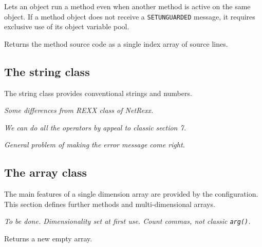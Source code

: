 

Lets an object run a method even when another method is active on the
same object. If a method object does not receive a \texttt{SETUNGUARDED}
message, it requires exclusive use of its object variable pool.



Returns the method source code as a single index array of source lines.



\subsection{The string class}\label{the-string-class}

The string class provides conventional strings and numbers.

\emph{Some differences from REXX class of NetRexx.}



\emph{We can do all the operators by appeal to classic section 7.}



\emph{General problem of making the error message come right.}



\subsection{The array class}\label{the-array-class}

The main features of a single dimension array are provided by the
configuration. This section defines further methods and
multi-dimensional arrays.

\emph{To be done. Dimensionality set at first use. Count commas, not
classic \texttt{arg()}.}



Returns a new empty array.

